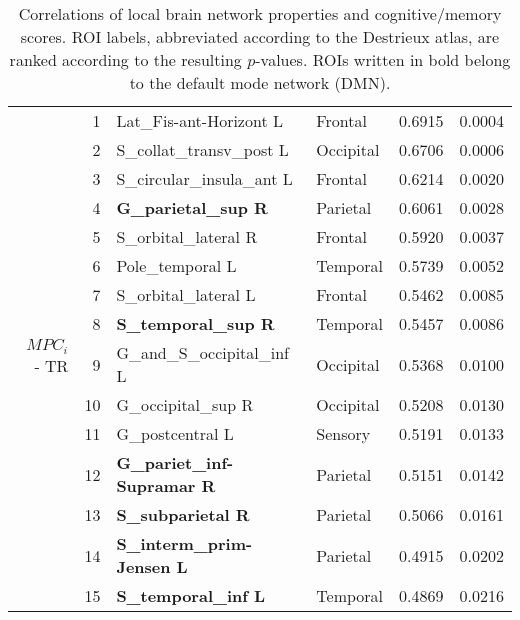 \begin{table}[!ht]
\begin{tabular}{rrllrr}
		\multirow{15}{*}{$MPC_i$ - TR}            & 1    & Lat\_Fis-ant-Horizont L        & Frontal         & 0.6915          & 0.0004    \\
		                                            & 2    & S\_collat\_transv\_post L               & Occipital       & 0.6706          & 0.0006    \\
		                                            & 3    & S\_circular\_insula\_ant L              & Frontal         & 0.6214          & 0.0020    \\
		                                            & 4    & \textbf{G\_parietal\_sup R}                      & Parietal        & 0.6061          & 0.0028    \\
		                                            & 5    & S\_orbital\_lateral R          & Frontal         & 0.5920          & 0.0037    \\
		                                            & 6    & Pole\_temporal L               & Temporal        & 0.5739          & 0.0052    \\
		                                            & 7    & S\_orbital\_lateral L          & Frontal         & 0.5462          & 0.0085    \\
		                                            & 8    & \textbf{S\_temporal\_sup R}             & Temporal        & 0.5457          & 0.0086    \\
		                                            & 9    & G\_and\_S\_occipital\_inf L             & Occipital       & 0.5368          & 0.0100    \\
		                                            & 10   & G\_occipital\_sup R                     & Occipital       & 0.5208          & 0.0130    \\
		                                            & 11   & G\_postcentral L                        & Sensory & 0.5191          & 0.0133    \\
		                                            & 12   & \textbf{G\_pariet\_inf-Supramar R}      & Parietal        & 0.5151          & 0.0142    \\
		                                            & 13   & \textbf{S\_subparietal R}               & Parietal        & 0.5066          & 0.0161    \\
		                                            & 14   & \textbf{S\_interm\_prim-Jensen L}                & Parietal        & 0.4915          & 0.0202    \\
		                                            & 15   & \textbf{S\_temporal\_inf L}             & Temporal        & 0.4869          & 0.0216    \\ \hline
	\end{tabular}
	\caption{Correlations of local brain network properties and cognitive/memory scores. ROI labels, abbreviated according to the Destrieux atlas, are ranked according to the resulting $p$-values. ROIs written in bold belong to the default mode network (DMN).}
	\label{tab:local_correlation}
\end{table}
